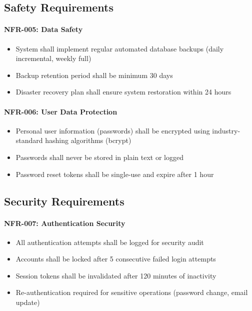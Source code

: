 \documentclass[12pt,a4paper]{article}
\begin{document}
\begin{enumerate}
\subsection{Safety Requirements}

\paragraph{NFR-005: Data Safety}
\begin{itemize}
    \item System shall implement regular automated database backups (daily incremental, weekly full)
    \item Backup retention period shall be minimum 30 days
    \item Disaster recovery plan shall ensure system restoration within 24 hours
\end{itemize}

\paragraph{NFR-006: User Data Protection}
\begin{itemize}
    \item Personal user information (passwords) shall be encrypted using industry-standard hashing algorithms (bcrypt)
    \item Passwords shall never be stored in plain text or logged
    \item Password reset tokens shall be single-use and expire after 1 hour
\end{itemize}

\subsection{Security Requirements}

\paragraph{NFR-007: Authentication Security}
\begin{itemize}
    \item All authentication attempts shall be logged for security audit
    \item Accounts shall be locked after 5 consecutive failed login attempts
    \item Session tokens shall be invalidated after 120 minutes of inactivity
    \item Re-authentication required for sensitive operations (password change, email update)
\end{itemize}


\end{enumerate}
\end{document}
